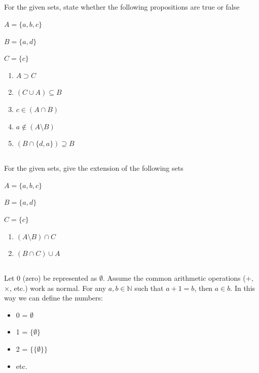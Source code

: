 \documentclass[twocolumn]{article}
\begin{document}
\subsection{}

    For the given sets, state whether the following propositions are true or false

    $ A = \{ a, b, c \} $

    $ B = \{ a, d \} $

    $ C = \{ c \} $

    \begin{enumerate}
        \item $ A \supset C $
        \item $ (C \cup A) \subseteq B $
        \item $ c \in ( A \cap B ) $
        \item $ a \not \in ( A \setminus B ) $
        \item $(B \cap \{d, a\} ) \supseteq B$
    \end{enumerate}

\subsection{}

    For the given sets, give the extension of the following sets

    $ A = \{ a, b, c \} $

    $ B = \{ a, d \} $

    $ C = \{ c \} $

    \begin{enumerate}
        \item $ (A \setminus B) \cap C$
        \item $ ( B \cap C ) \cup A $
    \end{enumerate}


\subsection{}

Let 0 (zero) be represented as $\emptyset$. Assume the common arithmetic operations ($+$, $\times$, etc.) work as normal. For any $a, b \in \mathbb{N}$ such that $a + 1 = b$, then $a \in b $. In this way we can define the numbers:

    \begin{itemize}
        \item 0 = $ \emptyset $
        \item 1 = $ \{ \emptyset \} $
        \item 2 = $ \{ \{ \emptyset \} \} $
        \item etc.
    \end{itemize}
\end{document}
